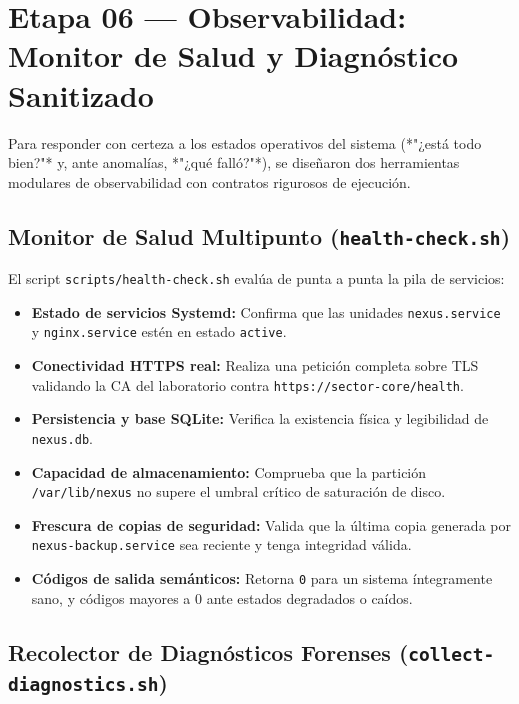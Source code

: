 \documentclass[10pt,a4paper]{article}
\begin{document}
\section{Etapa 06 — Observabilidad: Monitor de Salud y Diagnóstico Sanitizado}

Para responder con certeza a los estados operativos del sistema (*"¿está todo bien?"* y, ante anomalías, *"¿qué falló?"*), se diseñaron dos herramientas modulares de observabilidad con contratos rigurosos de ejecución.

\subsection{Monitor de Salud Multipunto (\texttt{health-check.sh})}

El script \texttt{scripts/health-check.sh} evalúa de punta a punta la pila de servicios:
\begin{itemize}[leftmargin=*]
    \item \textbf{Estado de servicios Systemd:} Confirma que las unidades \texttt{nexus.service} y \texttt{nginx.service} estén en estado \texttt{active}.
    \item \textbf{Conectividad HTTPS real:} Realiza una petición completa sobre TLS validando la CA del laboratorio contra \texttt{https://sector-core/health}.
    \item \textbf{Persistencia y base SQLite:} Verifica la existencia física y legibilidad de \texttt{nexus.db}.
    \item \textbf{Capacidad de almacenamiento:} Comprueba que la partición \texttt{/var/lib/nexus} no supere el umbral crítico de saturación de disco.
    \item \textbf{Frescura de copias de seguridad:} Valida que la última copia generada por \texttt{nexus-backup.service} sea reciente y tenga integridad válida.
    \item \textbf{Códigos de salida semánticos:} Retorna \texttt{0} para un sistema íntegramente sano, y códigos mayores a 0 ante estados degradados o caídos.
\end{itemize}

\subsection{Recolector de Diagnósticos Forenses (\texttt{collect-diagnostics.sh})}
\end{document}
